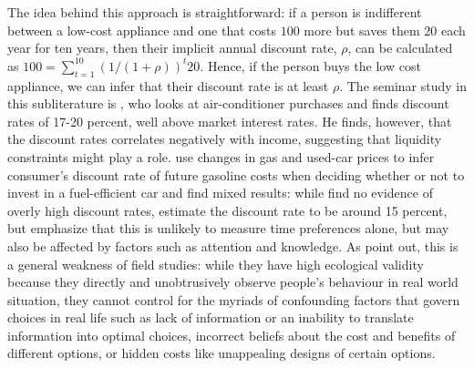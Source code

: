 \documentclass[a4paper, 11pt]{report}
\begin{document}
The idea behind this approach is straightforward: if a person is indifferent between a low-cost appliance and one that costs $100$ more but saves them $20$ each year for ten years, then their implicit annual discount rate, $\rho$, can be calculated as $100 = \sum^{10}_{t=1} (1 / (1 + \rho))^{t}20$. Hence, if the person buys the low cost appliance, we can infer that their discount rate is at least $\rho$. The seminar study in this subliterature is \citet{hausman1979individual}, who looks at air-conditioner purchases and finds discount rates of 17-20 percent, well above market interest rates. He finds, however, that the discount rates correlates negatively with income, suggesting that liquidity constraints might play a role. \citet{busse2013consumers,allcott2014gasoline} use changes in gas and used-car prices to infer consumer's discount rate of future gasoline costs when deciding whether or not to invest in a fuel-efficient car and find mixed results: while \citet{busse2013consumers} find no evidence of overly high discount rates, \citet{allcott2014gasoline} estimate the discount rate to be around 15 percent, but emphasize that this is unlikely to measure time preferences alone, but may also be affected by factors such as attention and knowledge. As \citet{frederick2002time} point out, this is a general weakness of field studies: while they have high ecological validity because they directly and unobtrusively observe people's behaviour in real world situation, they cannot control for the myriads of confounding factors that govern choices in real life such as lack of information or an inability to translate information into optimal choices, incorrect beliefs about the cost and benefits of different options, or hidden costs like unappealing designs of certain options.
\end{document}
